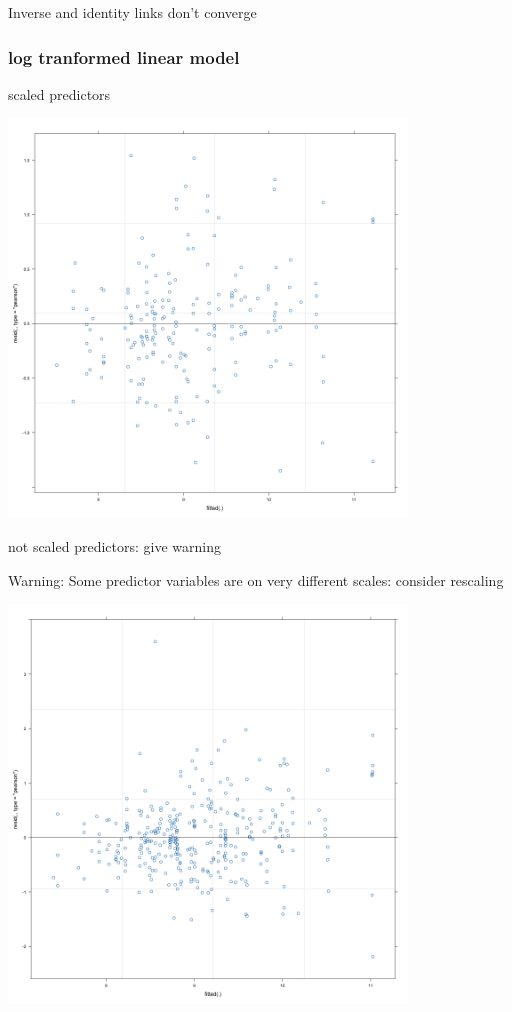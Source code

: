 \documentclass[
  letterpaper,
  DIV=11,
  numbers=noendperiod]{scrartcl}
\begin{document}
Inverse and identity links don't converge

\hypertarget{log-tranformed-linear-model}{%
\subsubsection{log tranformed linear
model}\label{log-tranformed-linear-model}}

scaled predictors

\includegraphics[width=4.16667in,height=\textheight]{residual plots for gzlm/log_transformed.png}

not scaled predictors: give warning

Warning: Some predictor variables are on very different scales: consider
rescaling

\includegraphics[width=4.16667in,height=\textheight]{residual plots for gzlm/normal_not_transformed.png}
\end{document}
